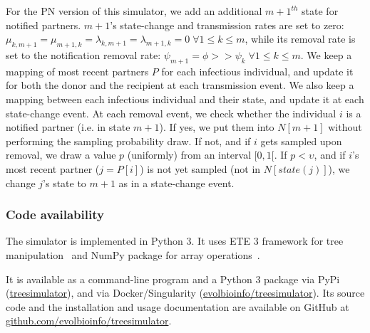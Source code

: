 \documentclass[a4paper,10pt]{article}
\begin{document}
For the PN version of this simulator, we add an additional $m+1^{th}$ state for notified partners. $m + 1$'s state-change and transmission rates are set to zero: $\mu_{k,m+1} = \mu_{m+1,k} = \lambda_{k,m+1} = \lambda_{m+1,k} = 0\; \forall 1 \leq k \leq m$, while its removal rate is set to the notification removal rate: $\psi_{m+1} = \phi >> \psi_k\; \forall 1 \leq k \leq m$. We keep a mapping of most recent partners $P$ for each infectious individual, and update it for both the donor and the recipient at each transmission event. We also keep a mapping between each infectious individual and their state, and update it at each state-change event. At each removal event, we check whether the individual $i$ is a notified partner (i.e. in state $m+1$). If yes, we put them into $N[m+1]$ without performing the sampling probability draw. If not, and if $i$ gets sampled upon removal, we draw a value $p$ (uniformly) from an interval $[0, 1[$. If $p < \upsilon$, and if $i$'s most recent partner ($j = P[i]$) is not yet sampled (not in $N[state(j)]$), we change $j$'s state to $m + 1$ as in a state-change event.

\subsubsection*{Code availability}
The simulator is implemented in Python 3. It uses ETE 3 framework for tree manipulation~\citep{Huerta-Cepas2016} and NumPy package for array operations~\citep{harris_array_2020}. 

It is available as a command-line program and a Python 3 package via PyPi (\href{https://pypi.org/project/treesimulator}{treesimulator}), and via Docker/Singularity (\href{https://hub.docker.com/r/evolbioinfo/treesimulator/tags}{evolbioinfo/treesimulator}). Its source code and the installation and usage documentation are available on GitHub at \href{https://github.com/evolbioinfo/treesimulator}{github.com/evolbioinfo/treesimulator}.
\end{document}
